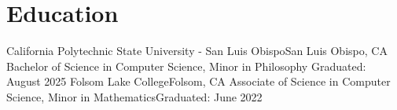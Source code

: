 \section{Education}
  \resumeSubHeadingListStart
    \resumeSubheading
      {California Polytechnic State University - San Luis Obispo}{San Luis Obispo, CA}
      {Bachelor of Science in Computer Science, Minor in Philosophy} {Graduated: August 2025}
    \resumeSubheading
      {Folsom Lake College}{Folsom, CA}
      {Associate of Science in Computer Science, Minor in Mathematics}{Graduated: June 2022}
  \resumeSubHeadingListEnd
